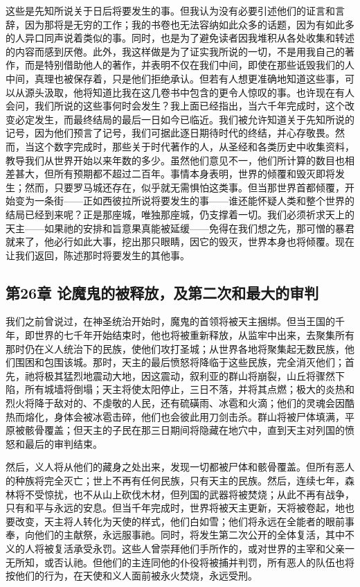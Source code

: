 这些是先知所说关于日后将要发生的事。但我认为没有必要引述他们的证言和言辞，因为那将是无穷的工作；我的书卷也无法容纳如此众多的话题，因为有如此多的人异口同声说着类似的事。同时，也是为了避免读者因我堆积从各处收集和转述的内容而感到厌倦。此外，我这样做是为了证实我所说的一切，不是用我自己的著作，而是特别借助他人的著作，并表明不仅在我们中间，即使在那些诋毁我们的人中间，真理也被保存着，只是他们拒绝承认。但若有人想更准确地知道这些事，可以从源头汲取，他将知道比我在这几卷书中包含的更令人惊叹的事。也许现在有人会问，我们所说的这些事何时会发生？我上面已经指出，当六千年完成时，这个改变必定发生，而最终结局的最后一日如今已临近。我们被允许知道关于先知所说的记号，因为他们预言了记号，我们可据此逐日期待时代的终结，并心存敬畏。然而，当这个数字完成时，那些关于时代著作的人，从圣经和各类历史中收集资料，教导我们从世界开始以来年数的多少。虽然他们意见不一，他们所计算的数目也相差甚大，但所有预期都不超过二百年。事情本身表明，世界的倾覆和毁灭即将发生；然而，只要罗马城还存在，似乎就无需惧怕这类事。但当那世界首都倾覆，开始变为一条街——正如西彼拉所说将要发生的事——谁还能怀疑人类和整个世界的结局已经到来呢？正是那座城，唯独那座城，仍支撑着一切。我们必须祈求天上的天主——如果祂的安排和旨意果真能被延缓——免得在我们想之先，那可憎的暴君就来了，他必行如此大事，挖出那只眼睛，因它的毁灭，世界本身也将倾覆。现在让我们返回，陈述那时将要发生的其他事。\par


\subsection{第26章 论魔鬼的被释放，及第二次和最大的审判}

我们之前曾说过，在神圣统治开始时，魔鬼的首领将被天主捆绑。但当王国的千年，即世界的七千年开始结束时，他也将被重新释放，从监牢中出来，去聚集所有那时仍在义人统治下的民族，使他们攻打圣城；从世界各地将聚集起无数民族，他们围困和包围该城。那时，天主的最后愤怒将降临于这些民族，完全消灭他们；首先，祂将极其猛烈地震动大地，因这震动，叙利亚的群山将崩裂，山丘将骤然下陷，所有城墙将倒塌；天主将使太阳停止，三日不落，并将其点燃；极大的炎热和烈火将降于敌对的、不虔敬的人民，还有硫磺雨、冰雹和火滴；他们的灵魂会因酷热而熔化，身体会被冰雹击碎，他们也会彼此用刀剑击杀。群山将被尸体填满，平原被骸骨覆盖；但天主的子民在那三日期间将隐藏在地穴中，直到天主对列国的愤怒和最后的审判结束。\par

然后，义人将从他们的藏身之处出来，发现一切都被尸体和骸骨覆盖。但所有恶人的种族将完全灭亡；世上不再有任何民族，只有天主的民族。然后，连续七年，森林将不受惊扰，也不从山上砍伐木材，但列国的武器将被焚烧；从此不再有战争，只有和平与永远的安息。但当千年完成时，世界将被天主更新，天将被卷起，地也要改变，天主将人转化为天使的样式，他们白如雪；他们将永远在全能者的眼前事奉，向他们的主献祭，永远服事祂。同时，将发生第二次公开的全体复活，其中不义的人将被复活承受永罚。这些人曾崇拜他们手所作的，或对世界的主宰和父亲一无所知，或否认祂。但他们的主连同他的仆役将被捕并判罚，所有恶人的队伍也将按他们的行为，在天使和义人面前被永火焚烧，永远受刑。\par

